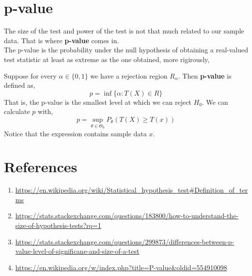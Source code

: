 \section{p-value}
The size of the test and power of the test is not that much related to our sample data. That is where \textbf{p-value} comes in. \\
The p-value is the probability under the null hypothesis of obtaining a real-valued test statistic at least as extreme as the one obtained, more rigirously,
\begin{definition}
    Suppose for every $\alpha \in \{ 0,1 \}$ we have a rejection region $R_{\alpha}$. Then \textbf{p-value} is defined as,
\[ p = \inf \biggl \{  \alpha: T(X) \in R  \biggr \} \]
That is, the p-value is the smallest level at which we can reject $H_0$. We can calculate $p$ with,
\[ p = \sup_{\theta \in \Theta_{0}} P_{\theta}( T(X) \ge T(x)) \]
Notice that the expression contains sample data $x$.
\end{definition}
\section{References}
\begin{enumerate}
    \item \url{https://en.wikipedia.org/wiki/Statistical_hypothesis_test#Definition_of_terms}
    \item \url{https://stats.stackexchange.com/questions/183800/how-to-understand-the-size-of-hypothesis-tests?rq=1}
    \item \url{https://stats.stackexchange.com/questions/299873/differences-between-p-value-level-of-significane-and-size-of-a-test}
    \item \url{https://en.wikipedia.org/w/index.php?title=P-value&oldid=554910098}
\end{enumerate}

